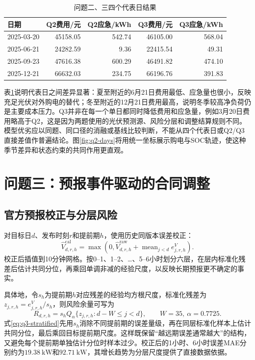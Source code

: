 \documentclass[UTF8,12pt,a4paper]{ctexart}
\theoremstyle{remark}
\begin{document}
\begin{table}[H]\centering\small
\caption{问题二、三四个代表日结果}\label{tab:representative-days}
\begin{tabular}{lrrrr}\toprule
日期&Q2费用/元&Q2应急/kWh&Q3费用/元&Q3应急/kWh\\\midrule
2025-03-20&45158.05&542.74&46105.00&568.04\\
2025-06-21&24282.59&9.36&22415.54&49.31\\
2025-09-23&47616.38&600.29&46491.82&474.10\\
2025-12-21&66632.03&234.75&66196.76&391.83\\\bottomrule
\end{tabular}\end{table}

表\ref{tab:representative-days}说明代表日之间差异显著：夏至附近的6月21日费用最低、应急量也很小，反映充足光伏对外购电的替代；冬至附近的12月21日费用最高，说明冬季较高净负荷仍是主要成本压力。Q3并非在每一个单日都同时降低费用和应急量，例如3月20日费用略高于Q2，这是因为两题使用的光伏预测源、风险分层和调整结算规则不同。模型优劣应以同题、同口径的消融或基线比较判断，不能从四个代表日或Q2/Q3直接差值作普遍结论。图\ref{fig:q2-days}将用统一坐标展示购电与SOC轨迹，使这种季节差异和状态约束的共同作用更直观。

\section{问题三：预报事件驱动的合同调整}
\subsection{官方预报校正与分层风险}
对目标日$d$、发布时刻$r$和提前期$h$，使用历史同版本误差校正：
\begin{equation}\widehat V^{\mathrm{cal}}_{d,r,h}=\max\left(0,\widehat V^{\mathrm{raw}}_{d,r,h}+\operatorname{mean}_{j<d}e^V_{j,r,h}\right).\label{eq:q3-calibrate}\end{equation}
校正后插值到10分钟网格。按0--1、1--2、\ldots、5--6小时划分六层，在层内标准化残差后估计共同分位，再乘回单调非减的经验尺度，以反映长期预报更不确定的事实。

具体地，令$s_h$为提前期$h$对应残差的经验均方根尺度，标准化残差为$z_{j,r,h}=e^V_{j,r,h}/s_h$，则风险余量可写为
\begin{equation}
R_{d,r,h}=s_h Q_{\alpha}\{z_{j,r,h}:d-W\le j<d\},\qquad W=35,\ \alpha=0.7725.
\label{eq:q3-stratified}
\end{equation}
式\eqref{eq:q3-stratified}先用$s_h$消除不同提前期的误差量级，再在同层标准化样本上估计共同分位，最后乘回目标提前期尺度。这样既保留“越远期误差通常越大”的结构，又避免每个提前期单独估计分位时样本过少。校正后的1小时、6小时误差MAE分别约为$19.38\ \mathrm{kW}$和$92.71\ \mathrm{kW}$，其增长趋势为分层尺度提供了直接数据依据。
\end{document}
